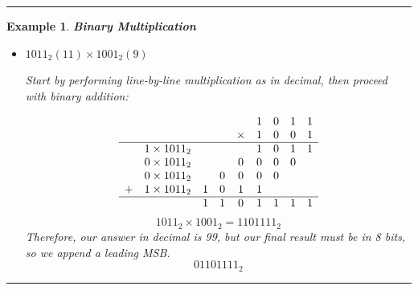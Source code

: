 \documentclass[12pt]{article}
\newtheorem{example}{Example}
\newenvironment{examp}
{\vspace{0.5cm}
 \hrule
\vspace{0.5cm}
\begin{example}}
{\hrule
\vspace{0.5cm}
\end{example}}
\begin{document}
\begin{examp}
	\textbf{Binary Multiplication}
	\begin{itemize}
		\item \(1011_2 (11) \times 1001_2 (9)\)

		      Start by performing line-by-line multiplication as in decimal, then proceed with binary addition:

		      \[
			      \begin{array}{ccccccccc}
				        &                 &   &   &        & 1 & 0 & 1 & 1 \\
				        &                 &   &   & \times & 1 & 0 & 0 & 1 \\
				      \hline
				        & 1 \times 1011_2 &   &   &        & 1 & 0 & 1 & 1 \\
				        & 0 \times 1011_2 &   &   & 0      & 0 & 0 & 0 &   \\
				        & 0 \times 1011_2 &   & 0 & 0      & 0 & 0 &   &   \\
				      + & 1 \times 1011_2 & 1 & 0 & 1      & 1 &   &   &   \\
				      \hline
				        &                 & 1 & 1 & 0      & 1 & 1 & 1 & 1 \\
			      \end{array}
		      \]
		      \[
			      1011_2 \times 1001_2 = 1101111_2
		      \]
		      Therefore, our answer in decimal is 99, but our final result must be in 8 bits, so we append a leading MSB.
		      \[
			      01101111_2
		      \]

	\end{itemize}
\end{examp}
\end{document}
